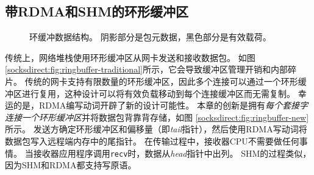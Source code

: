 \subsection{带RDMA和SHM的环形缓冲区}
\label{socksdirect:subsec:lockless-queue}

\begin{figure}[t]
	\centering
	\hspace{0.02\textwidth}
	
	\caption{环缓冲数据结构。 阴影部分是包元数据，黑色部分是有效载荷。}
\end{figure}

传统上，网络堆栈使用环形缓冲区从网卡发送和接收数据包。
如图 \ref {socksdirect:fig:ringbuffer-traditional}所示，它会导致缓冲区管理开销和内部碎片。
传统的网卡支持有限数量的环形缓冲区，因此多个连接可以通过一个环形缓冲区进行复用，这种设计可以将有效负载移动到每个连接缓冲区而无需复制。
幸运的是，RDMA编写动词开辟了新的设计可能性。
本章的创新是拥有\emph {每个套接字连接一个环形缓冲区}并将数据包背靠背存储，如图 \ref {socksdirect:fig:ringbuffer-new}所示。
发送方确定环形缓冲区和偏移量（即\emph {tail}指针），然后使用RDMA写动词将数据包写入远程端内存中的尾指针。
在传输过程中，接收器CPU不需要做任何事情。
当接收器应用程序调用\texttt {recv}时，数据从\emph {head}指针中出列。
SHM的过程类似，因为SHM和RDMA都支持写原语。

